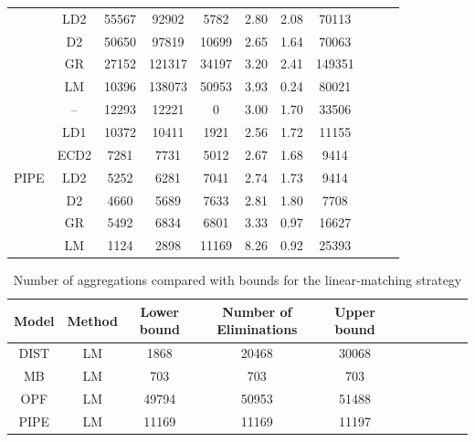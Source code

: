 \documentclass[smallextended]{svjour3}
\begin{document}
\begin{table}[]
\begin{tabular}{ccccccccccc}
                      & LD2       &  55567 &  92902 &  5782 & 2.80 & 2.08 &  70113\\
                      & D2        &  50650 &  97819 & 10699 & 2.65 & 1.64 &  70063\\
                      & GR        &  27152 & 121317 & 34197 & 3.20 & 2.41 & 149351\\
                      & LM        &  10396 & 138073 & 50953 & 3.93 & 0.24 &  80021\\
\midrule
\multirow{7}{*}{PIPE} & --        &  12293 &  12221 &     0 & 3.00 & 1.70 &  33506\\
                      & LD1       &  10372 &  10411 &  1921 & 2.56 & 1.72 &  11155\\
                      & ECD2      &   7281 &   7731 &  5012 & 2.67 & 1.68 &   9414\\
                      & LD2       &   5252 &   6281 &  7041 & 2.74 & 1.73 &   9414\\
                      & D2        &   4660 &   5689 &  7633 & 2.81 & 1.80 &   7708\\
                      & GR        &   5492 &   6834 &  6801 & 3.33 & 0.97 &  16627\\
                      & LM        &   1124 &   2898 & 11169 & 8.26 & 0.92 &  25393\\     
\bottomrule
    \end{tabular}
    \label{tab:structure}
\end{table}
\begin{table}[]
    \centering
    \caption{Number of aggregations compared with bounds for the linear-matching
    strategy}
    \vspace{0.2cm}
    \begin{tabular}{ccccccccccc}
\toprule
Model     & Method    & Lower bound & Number of Eliminations & Upper bound\\
\midrule
DIST      & LM        &  1868 & 20468 & 30068\\
MB        & LM        &   703 &   703 &   703\\
OPF       & LM        & 49794 & 50953 & 51488\\
PIPE      & LM        & 11169 & 11169 & 11197\\
\bottomrule
    \end{tabular}
    \label{tab:matching-structure}
\end{table}
\end{document}
